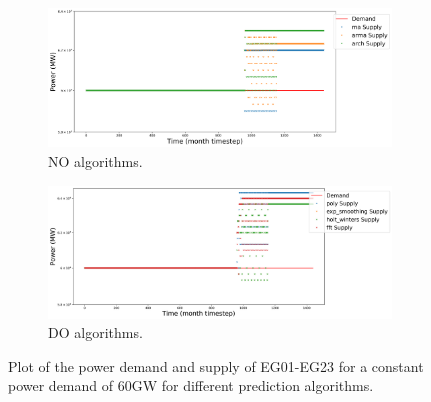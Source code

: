 \documentclass[11pt,letterpaper]{article}
\begin{document}
\begin{figure}[]
	\centering
	\begin{subfigure}[t]{\textwidth}
		\centering
		\includegraphics[width=\linewidth]{23-power-bufferB20001.png} 
		\caption{NO algorithms.}
		\label{fig:23powerNO}
	\end{subfigure}
	\vspace{1cm}
	\begin{subfigure}[t]{\textwidth}
		\centering
		\includegraphics[width=\linewidth]{23-power-bufferB20002.png} 
		\caption{DO algorithms.}
		\label{fig:23powerDO}
	\end{subfigure}
	\hfill
	\caption{Plot of the power demand and supply of EG01-EG23 for a constant power demand of 60GW for different prediction algorithms.}
	\label{fig:23power}
\end{figure}
\end{document}
